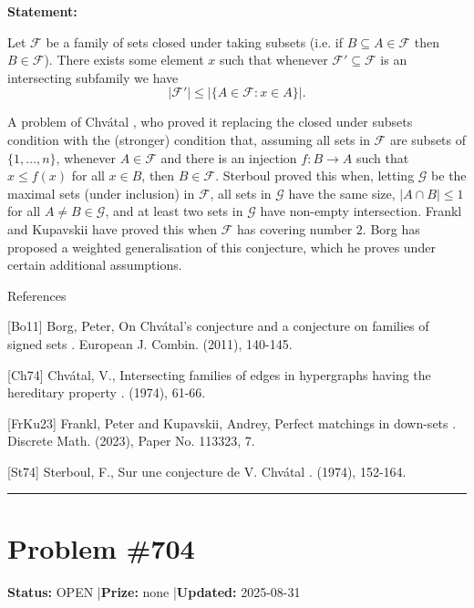 \documentclass{article}
\begin{document}
\medskip

\noindent\textbf{Statement:}

Let $\mathcal{F}$ be a family of sets closed under taking subsets (i.e. if $B\subseteq A\in\mathcal{F}$ then $B\in \mathcal{F}$). There exists some element $x$ such that whenever $\mathcal{F}'\subseteq \mathcal{F}$ is an intersecting subfamily we have\[\lvert \mathcal{F}'\rvert \leq \lvert \{ A\in \mathcal{F} : x\in A\}\rvert.\]




A problem of Chv\'{a}tal \cite{Ch74}, who proved it replacing the closed under subsets condition with the (stronger) condition that, assuming all sets in $\mathcal{F}$ are subsets of $\{1,\ldots,n\}$, whenever $A\in \mathcal{F}$ and there is an injection $f:B\to A$ such that $x\leq f(x)$ for all $x\in B$, then $B\in \mathcal{F}$. Sterboul \cite{St74} proved this when, letting $\mathcal{G}$ be the maximal sets (under inclusion) in $\mathcal{F}$, all sets in $\mathcal{G}$ have the same size, $\lvert A\cap B\rvert\leq 1$ for all $A\neq B\in \mathcal{G}$, and at least two sets in $\mathcal{G}$ have non-empty intersection. Frankl and Kupavskii \cite{FrKu23} have proved this when $\mathcal{F}$ has covering number $2$. Borg \cite{Bo11} has proposed a weighted generalisation of this conjecture, which he proves under certain additional assumptions.




References

[Bo11] Borg, Peter, On Chv\'{a}tal's conjecture and a conjecture on families of signed sets . European J. Combin. (2011), 140-145.

[Ch74] Chv\'{a}tal, V., Intersecting families of edges in hypergraphs having the hereditary property . (1974), 61-66.

[FrKu23] Frankl, Peter and Kupavskii, Andrey, Perfect matchings in down-sets . Discrete Math. (2023), Paper No. 113323, 7.

[St74] Sterboul, F., Sur une conjecture de V. Chv\'{a}tal . (1974), 152-164.

\noindent\rule{\linewidth}{0.4pt}


\section{Problem \#704}
\label{prob:704}

\noindent\textbf{Status:} OPEN \quad|\quad \textbf{Prize:} none \quad|\quad \textbf{Updated:} 2025-08-31
\end{document}
